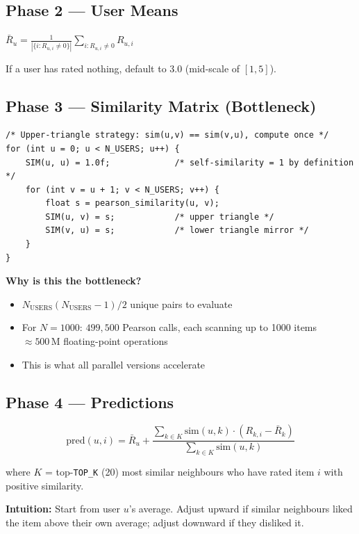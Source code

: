 \documentclass[12pt,a4paper]{article}
\begin{document}
\subsection{Phase 2 — User Means}

$\bar{R}_u = \frac{1}{|\{i : R_{u,i} \neq 0\}|} \sum_{i: R_{u,i} \neq 0} R_{u,i}$

If a user has rated nothing, default to 3.0 (mid-scale of $[1,5]$).

\subsection{Phase 3 — Similarity Matrix (Bottleneck)}

\begin{lstlisting}
/* Upper-triangle strategy: sim(u,v) == sim(v,u), compute once */
for (int u = 0; u < N_USERS; u++) {
    SIM(u, u) = 1.0f;             /* self-similarity = 1 by definition */
    for (int v = u + 1; v < N_USERS; v++) {
        float s = pearson_similarity(u, v);
        SIM(u, v) = s;            /* upper triangle */
        SIM(v, u) = s;            /* lower triangle mirror */
    }
}
\end{lstlisting}

\textbf{Why is this the bottleneck?}
\begin{itemize}
    \item $N_{\text{USERS}}(N_{\text{USERS}}-1)/2$ unique pairs to evaluate
    \item For $N = 1000$: $499{,}500$ Pearson calls, each scanning up to
          1000 items $\approx 500\,\text{M}$ floating-point operations
    \item This is what all parallel versions accelerate
\end{itemize}

\subsection{Phase 4 — Predictions}

\[
\text{pred}(u,i) = \bar{R}_u +
\frac{\displaystyle\sum_{k \in K} \text{sim}(u,k) \cdot (R_{k,i} - \bar{R}_k)}
     {\displaystyle\sum_{k \in K} \text{sim}(u,k)}
\]

where $K$ = top-\texttt{TOP\_K} (20) most similar neighbours who have rated item $i$ with positive similarity.

\textbf{Intuition:}  Start from user $u$'s average.  Adjust upward if
similar neighbours liked the item above their own average; adjust downward
if they disliked it.
\end{document}
